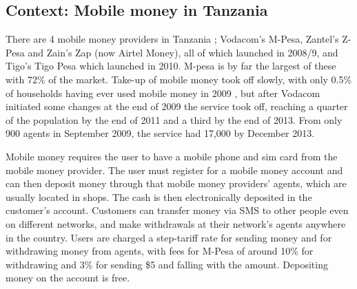 \subsection{Context: Mobile money in Tanzania}

There are 4 mobile money providers in Tanzania ; Vodacom's M-Pesa, Zantel's Z-Pesa and Zain's Zap (now Airtel Money), all of which launched in 2008/9, and Tigo's Tigo Pesa which launched in 2010. M-pesa is by far the largest of these with 72\% of the market. Take-up of mobile money took off slowly, with only 0.5\% of households having ever used mobile money in 2009 \citep{FSD2013}, but after Vodacom initiated some changes at the end of 2009 the service took off, reaching a quarter of the population by the end of 2011 and a third by the end of 2013. From only 900 agents in September 2009, the service had 17,000 by December 2013.

Mobile money requires the user to have a mobile phone and sim card from the mobile money provider. The user must register for a mobile money account and can then deposit money through that mobile money providers' agents, which are usually located in shops. The cash is then electronically deposited in the customer's account. Customers can transfer money via SMS to other people even on different networks,  and make withdrawals at their network's agents anywhere in the country. Users are charged a step-tariff rate for sending money and for withdrawing money from agents, with fees for M-Pesa of around 10\% for withdrawing and 3\%  for sending \$5 and falling with the amount. Depositing money on the account is free.  